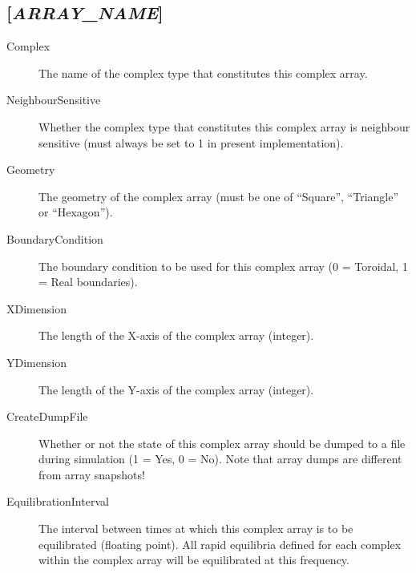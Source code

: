 \subsection{[\emph{ARRAY\_NAME}]}
\begin{description}
\item[Complex] The name of the complex type that constitutes this
  complex array.
  
\item[NeighbourSensitive] Whether the complex type that constitutes
  this complex array is neighbour sensitive (must always be set to 1
  in present implementation).

\item[Geometry] The geometry of the complex array (must be one of
  ``Square'', ``Triangle'' or ``Hexagon'').

\item[BoundaryCondition] The boundary condition to be used for this
  complex array (0 = Toroidal, 1 = Real boundaries).

\item[XDimension] The length of the X-axis of the complex array (integer).

\item[YDimension] The length of the Y-axis of the complex array (integer).
  
\item[CreateDumpFile] Whether or not the state of this complex array
  should be dumped to a file during simulation (1 = Yes, 0 = No).
  Note that array dumps are different from array snapshots!
  
\item[EquilibrationInterval] The interval between times at which this
  complex array is to be equilibrated (floating point).  All rapid
  equilibria defined for each complex within the complex array will be
  equilibrated at this frequency.
\end{description}

